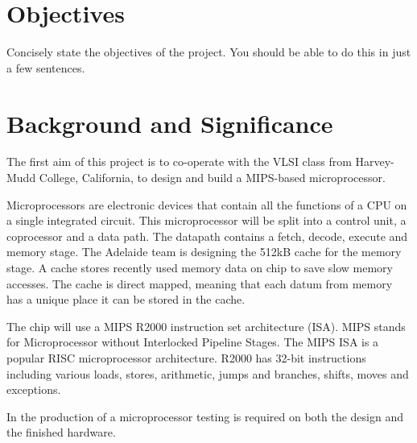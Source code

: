 \documentclass[a4paper,12pt]{article}
\begin{document}
\newpage
\section*{Objectives}
Concisely state the objectives of the project. You should be able to
do this in just a few sentences.

\newpage
\tableofcontents

\newpage
\section{Background and Significance}

The first aim of this project is to co-operate with the VLSI class
from Harvey-Mudd College, California, to design and build a MIPS-based
microprocessor.

Microprocessors are electronic devices that contain all the functions
of a CPU on a single integrated circuit. This microprocessor will be
split into a control unit, a coprocessor and a data path. The datapath
contains a fetch, decode, execute and memory stage. The Adelaide team
is designing the 512kB cache for the memory stage. A cache stores
recently used memory data on chip to save slow memory accesses. The
cache is direct mapped, meaning that each datum from memory has a
unique place it can be stored in the cache.

The chip will use a MIPS R2000 instruction set architecture
(ISA). MIPS stands for Microprocessor without Interlocked Pipeline
Stages. The MIPS ISA is a popular RISC microprocessor
architecture. R2000 has 32-bit instructions including various loads,
stores, arithmetic, jumps and branches, shifts, moves and exceptions.

In the production of a microprocessor testing is required on both the
design and the finished hardware.
\end{document}
